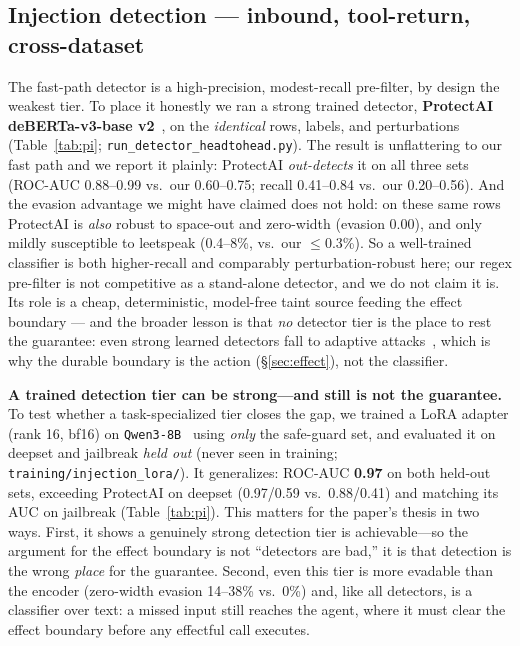 \documentclass[11pt]{article}
\newcommand{\good}[1]{\textcolor{good}{\textbf{#1}}}
\newcommand{\code}[1]{\texttt{\small #1}}
\begin{document}
\subsection{Injection detection --- inbound, tool-return, cross-dataset}\label{sec:inbound}
The fast-path detector is a high-precision, modest-recall pre-filter, by design the weakest
tier. To place it honestly we ran a strong trained detector, \textbf{ProtectAI deBERTa-v3-base
v2}~\cite{protectai}, on the \emph{identical} rows, labels, and perturbations
(Table~\ref{tab:pi}; \code{run\_detector\_headtohead.py}). The result is unflattering to our fast
path and we report it plainly: ProtectAI \emph{out-detects} it on all three sets (ROC-AUC
0.88--0.99 vs.\ our 0.60--0.75; recall 0.41--0.84 vs.\ our 0.20--0.56). And the evasion advantage
we might have claimed does not hold: on these same rows ProtectAI is \emph{also} robust to
space-out and zero-width (evasion 0.00), and only mildly susceptible to leetspeak (0.4--8\%, vs.\
our $\le$0.3\%). So a well-trained classifier is both higher-recall and comparably
perturbation-robust here; our regex pre-filter is not competitive as a stand-alone detector, and
we do not claim it is. Its role is a cheap, deterministic, model-free taint source feeding the
effect boundary --- and the broader lesson is that \emph{no} detector tier is the place to rest the
guarantee: even strong learned detectors fall to adaptive attacks~\cite{firewalls}, which is why
the durable boundary is the action (\S\ref{sec:effect}), not the classifier.

\textbf{A trained detection tier can be strong---and still is not the guarantee.}
To test whether a task-specialized tier closes the gap, we trained a LoRA adapter (rank 16, bf16) on
\code{Qwen3-8B}~\cite{qwen3} using \emph{only} the safe-guard set, and evaluated it on deepset and
jailbreak \emph{held out} (never seen in training; \code{training/injection\_lora/}). It generalizes:
ROC-AUC \good{0.97} on both held-out sets, exceeding ProtectAI on deepset (0.97/0.59 vs.\ 0.88/0.41)
and matching its AUC on jailbreak (Table~\ref{tab:pi}). This matters for the paper's thesis in two
ways. First, it shows a genuinely strong detection tier is achievable---so the argument for the effect
boundary is not ``detectors are bad,'' it is that detection is the wrong \emph{place} for the
guarantee. Second, even this tier is more evadable than the encoder (zero-width evasion 14--38\% vs.\
0\%) and, like all detectors, is a classifier over text: a missed input still reaches the agent, where
it must clear the effect boundary before any effectful call executes.
\end{document}
